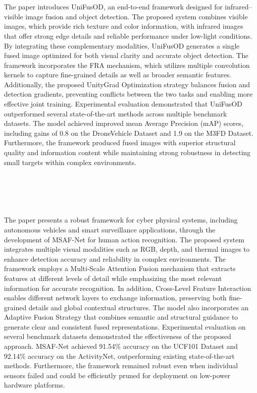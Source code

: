 \section[\LitTitleFive]{\LitTitleFive\ \textbf{\cite{supplementary_paper_5}} \label{sec:supplementary_paper_5}}
The paper introduces UniFusOD, an end-to-end framework designed for infrared--visible image fusion and object detection. The proposed system combines visible images, which provide rich texture and color information, with infrared images that offer strong edge details and reliable performance under low-light conditions. By integrating these complementary modalities, UniFusOD generates a single fused image optimized for both visual clarity and accurate object detection. The framework incorporates the FRA mechanism, which utilizes multiple convolution kernels to capture fine-grained details as well as broader semantic features. Additionally, the proposed UnityGrad Optimization strategy balances fusion and detection gradients, preventing conflicts between the two tasks and enabling more effective joint training. Experimental evaluation demonstrated that UniFusOD outperformed several state-of-the-art methods across multiple benchmark datasets. The model achieved improved mean Average Precision (mAP) scores, including gains of 0.8 on the DroneVehicle Dataset and 1.9 on the M3FD Dataset. Furthermore, the framework produced fused images with superior structural quality and information content while maintaining strong robustness in detecting small targets within complex environments.\label{end:supplementary_paper_5} \\

\section[\LitTitleSix]{\LitTitleSix~\textbf{\cite{supplementary_paper_6}} \label{sec:supplementary_paper_6}}
The paper presents a robust framework for cyber physical systems, including autonomous vehicles and smart surveillance applications, through the development of MSAF-Net for human action recognition. The proposed system integrates multiple visual modalities such as RGB, depth, and thermal images to enhance detection accuracy and reliability in complex environments. The framework employs a Multi-Scale Attention Fusion mechanism that extracts features at different levels of detail while emphasizing the most relevant information for accurate recognition. In addition, Cross-Level Feature Interaction enables different network layers to exchange information, preserving both fine-grained details and global contextual structures. The model also incorporates an Adaptive Fusion Strategy that combines semantic and structural guidance to generate clear and consistent fused representations. Experimental evaluation on several benchmark datasets demonstrated the effectiveness of the proposed approach. MSAF-Net achieved 91.54\% accuracy on the UCF101 Dataset and 92.14\% accuracy on the ActivityNet, outperforming existing state-of-the-art methods. Furthermore, the framework remained robust even when individual sensors failed and could be efficiently pruned for deployment on low-power hardware platforms.\label{end:supplementary_paper_6}\\

